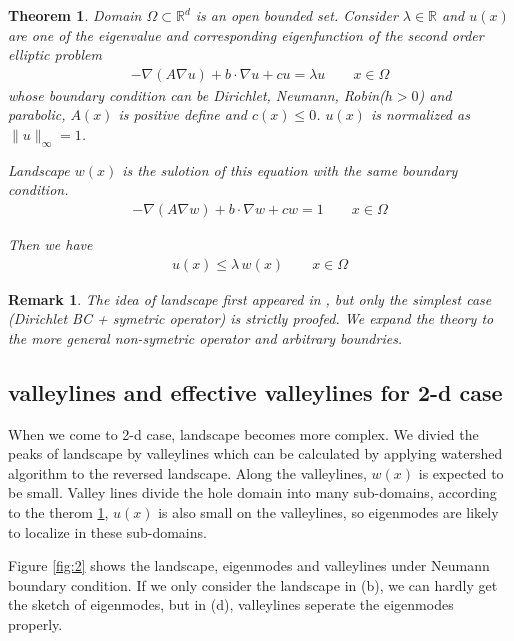 \documentclass[12pt,a4paper]{article}
\newtheorem{theorem}{Theorem}
\newtheorem{remark}{Remark}
\begin{document}
\begin{theorem}\label{th:landscape}
Domain $\Omega \subset \mathbb{R}^d$ is an open bounded set. Consider $\lambda \in \mathbb{R}$ and $u(x)$ are one of the eigenvalue and corresponding eigenfunction of the second order elliptic problem
\begin{align}
-\nabla(A \nabla u) + b \cdot \nabla u + c u = \lambda u \qquad x \in \Omega
\end{align}
whose boundary condition can be Dirichlet, Neumann, Robin($h > 0$) and parabolic, $A(x)$ is positive define and $c(x) \leq 0$. $u(x)$ is normalized as $\|u\|_{\infty} = 1$.

Landscape $w(x)$ is the sulotion of this equation with the same boundary condition.
\begin{align}
-\nabla(A \nabla w) + b \cdot \nabla w + c w = 1 \qquad x \in \Omega
\end{align}

Then we have
\begin{align}\label{eq:control}
u(x) \leq \lambda \, w(x) \qquad x \in \Omega
\end{align}
\end{theorem}

\begin{remark}
The idea of landscape first appeared in \cite{pnas}, but only the simplest case (Dirichlet BC + symetric operator) is strictly proofed. We expand the theory to the more general non-symetric operator and arbitrary boundries.
\end{remark}

\subsection{valleylines and effective valleylines for 2-d case}

When we come to 2-d case, landscape becomes more complex. We divied the peaks of landscape by valleylines which can be calculated by applying watershed algorithm to the reversed landscape. Along the valleylines, $w(x)$ is expected to be small. Valley lines divide the hole domain into many sub-domains, according to the therom \ref{th:landscape}, $u(x)$ is also small on the valleylines, so eigenmodes are likely to localize in these sub-domains.

Figure \ref{fig:2} shows the landscape, eigenmodes and valleylines under Neumann boundary condition. If we only consider the landscape in (b), we can hardly get the sketch of eigenmodes, but in (d), valleylines seperate the eigenmodes properly.
\end{document}
